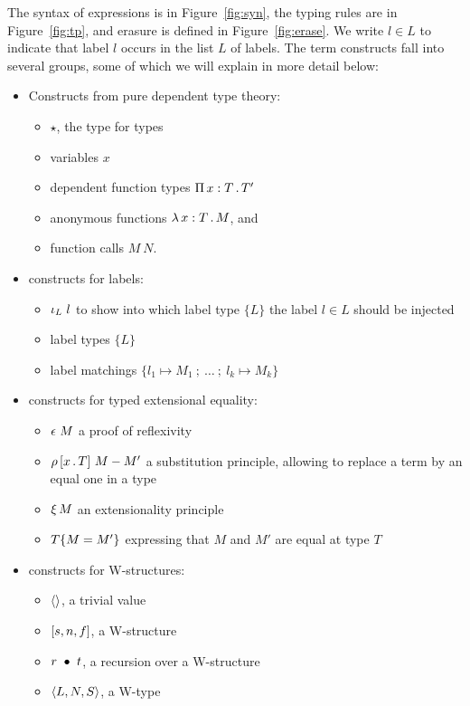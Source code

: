 \documentclass{article}
\begin{document}
The syntax of expressions is in Figure~\ref{fig:syn}, the typing rules
are in Figure~\ref{fig:tp}, and erasure is defined in
Figure~\ref{fig:erase}.  We write $l \in L$ to indicate that label $l$ occurs in the list $L$ of labels.
The term constructs fall into several groups, some of which we will explain in more detail below:
\begin{itemize}
\item Constructs from pure dependent type theory:
  \begin{itemize}
  \item $\star$, the type for types
  \item variables $x$
  \item dependent function types $\Pia{x}{T}{T'}$
  \item anonymous functions $\tlam{x}{T}{M}$, and
  \item function calls $M\ N$.
  \end{itemize}
\item constructs for labels:
  \begin{itemize}
  \item $\inj{L}{l}$ to show into which label type $\{ L \}$ the label $l \in L$ should be injected
  \item label types $\{ L \}$
  \item label matchings $\{ l_1 \mapsto M_1\ ;\ \ldots\ ;\ l_k\mapsto M_k \}$
  \end{itemize}
\item constructs for typed extensional equality:
  \begin{itemize}
  \item $\rfl{M}$ a proof of reflexivity
  \item $\cng{x}{T}{M}{M'}$ a substitution principle, allowing to replace a term by an equal one in a type
  \item $\ext{M}$ an extensionality principle
  \item $\eqtm{M}{T}{M'}$ expressing that $M$ and $M'$ are equal at type $T$
  \end{itemize}
\item constructs for W-structures:
  \begin{itemize}
  \item $\wunit$, a trivial value
  \item $\ctor{s}{n}{f}$, a W-structure
  \item $\wrec{r}{t}$, a recursion over a W-structure
  \item $\w{L}{N}{S}$, a W-type
  \end{itemize}
\end{itemize}
\end{document}
